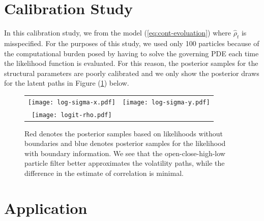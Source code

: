 \documentclass[10pt]{article}
\begin{document}
\section{Calibration Study}
In this calibration study, we from the model
(\ref{eq:cont-evoluation}) where $\hat{\rho}_t$ is misspecified. For
the purposes of this study, we used only 100 particles because of the
computational burden posed by having to solve the governing PDE each
time the likelihood function is evaluated. For this reason, the
posterior samples for the structural parameters are poorly calibrated
and we only show the posterior draws for the latent paths in Figure
(\ref{fig:calibration-results-paths}) below. 


\begin{figure}
  \begin{tabular}{cc}
    \begin{minipage}{0.45\textwidth}
       \centering
       \texttt{[image: log-sigma-x.pdf]}
     \end{minipage}
    & \begin{minipage}{0.45\textwidth}
       \centering
       \texttt{[image: log-sigma-y.pdf]}
     \end{minipage} \\
    \begin{minipage}{0.45\textwidth}
       \centering
       \texttt{[image: logit-rho.pdf]}
     \end{minipage}
  \end{tabular}
  \caption{Red denotes the posterior samples based on likelihoods
    without boundaries and blue denotes posterior samples for the
    likelihood with boundary information. We see that the
    open-close-high-low particle filter better approximates the
    volatility paths, while the difference in the estimate of
    correlation is minimal.}
  \label{fig:calibration-results-paths}
\end{figure}


\section{Application}



\end{document}
